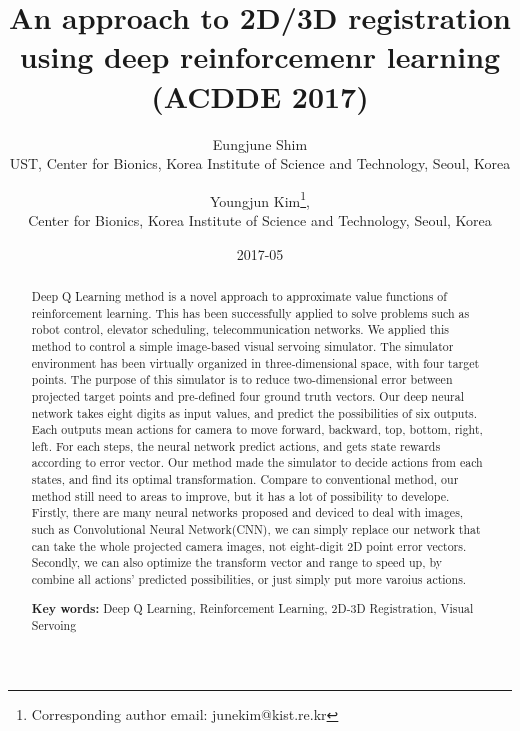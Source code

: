\documentclass[10pt]{article}
\begin{document}
\title{An approach to 2D/3D registration using deep reinforcemenr learning \\(ACDDE 2017)}

\author{Eungjune Shim \\ UST, Center for Bionics, Korea Institute of Science and Technology, Seoul, Korea
\and Youngjun Kim\thanks{Corresponding author email: junekim@kist.re.kr},
\\ Center for Bionics, Korea Institute of Science and Technology, Seoul, Korea}


%

\date{2017-05}
\maketitle

\begin{abstract}
 Deep Q Learning method is a novel approach to approximate value functions of reinforcement learning. This has been successfully applied to solve problems such as robot control, elevator scheduling, telecommunication networks. We applied this method to control a simple image-based visual servoing simulator. The simulator environment has been virtually organized in three-dimensional space, with four target points. The purpose of this simulator is to reduce two-dimensional error between projected target points and pre-defined four ground truth vectors. Our deep neural network takes eight digits as input values, and predict the possibilities of six outputs. Each outputs mean actions for camera to move forward, backward, top, bottom, right, left. For each steps, the neural network predict actions, and gets state rewards according to error vector. Our method made the simulator to decide actions from each states, and find its optimal transformation. Compare to conventional method, our method still need to areas to improve, but it has a lot of possibility to develope. Firstly, there are many neural networks proposed and deviced to deal with images, such as Convolutional Neural Network(CNN), we can simply replace our network that can take the whole projected camera images, not eight-digit 2D point error vectors. Secondly, we can also optimize the transform vector and range to speed up, by combine all actions' predicted possibilities, or just simply put more varoius actions. 

\vspace*{5mm}
\noindent
{\bf Key words:}  Deep Q Learning, Reinforcement Learning, 2D-3D Registration, Visual Servoing
\end{abstract}
\end{document}
